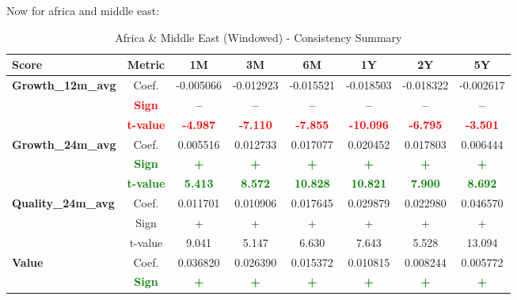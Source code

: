 \documentclass[11pt,english,a4paper,hidelinks]{book}
\begin{document}
\noindent Now for africa and middle east:
\begin{table}[H]
    \centering
    \caption{Africa \& Middle East (Windowed) - Consistency Summary}
    \begin{tabular}{lccccccc}
        \toprule
        \textbf{Score} & \textbf{Metric} & \textbf{1M} & \textbf{3M} & \textbf{6M} & \textbf{1Y} & \textbf{2Y} & \textbf{5Y} \\
        \midrule
        \multirow{3}{*}{\textbf{Growth\_12m\_avg}}
            & Coef.   & -0.005066 & -0.012923 & -0.015521 & -0.018503 & -0.018322 & -0.002617 \\
            & \textbf{\textcolor{red}{Sign}}    & \textbf{\textcolor{red}{–}} & \textbf{\textcolor{red}{–}} & \textbf{\textcolor{red}{–}} & \textbf{\textcolor{red}{–}} & \textbf{\textcolor{red}{–}} & \textbf{\textcolor{red}{–}} \\
            & \textbf{\textcolor{red}{t-value}} & \textbf{\textcolor{red}{-4.987}} & \textbf{\textcolor{red}{-7.110}} & \textbf{\textcolor{red}{-7.855}} & \textbf{\textcolor{red}{-10.096}} & \textbf{\textcolor{red}{-6.795}} & \textbf{\textcolor{red}{-3.501}} \\
        \multirow{3}{*}{\textbf{Growth\_24m\_avg}}
            & Coef.   & 0.005516 & 0.012733 & 0.017077 & 0.020452 & 0.017803 & 0.006444 \\
            & \textbf{\textcolor{green}{Sign}}    & \textbf{\textcolor{green}{+}} & \textbf{\textcolor{green}{+}} & \textbf{\textcolor{green}{+}} & \textbf{\textcolor{green}{+}} & \textbf{\textcolor{green}{+}} & \textbf{\textcolor{green}{+}} \\
            & \textbf{\textcolor{green}{t-value}} & \textbf{\textcolor{green}{5.413}} & \textbf{\textcolor{green}{8.572}} & \textbf{\textcolor{green}{10.828}} & \textbf{\textcolor{green}{10.821}} & \textbf{\textcolor{green}{7.900}} & \textbf{\textcolor{green}{8.692}} \\
        \midrule
        \multirow{3}{*}{\textbf{Quality\_24m\_avg}}
            & Coef.   & 0.011701 & 0.010906 & 0.017645 & 0.029879 & 0.022980 & 0.046570 \\
            & Sign    & + & + & + & + & + & + \\
            & t-value & 9.041 & 5.147 & 6.630 & 7.643 & 5.528 & 13.094 \\
        \midrule
        \multirow{3}{*}{\textbf{Value}}
            & Coef.   & 0.036820  & 0.026390  & 0.015372  & 0.010815  & 0.008244  & 0.005772  \\
            & \textbf{\textcolor{green}{Sign}}    & \textbf{\textcolor{green}{+}}         & \textbf{\textcolor{green}{+}}         & \textbf{\textcolor{green}{+}}         & \textbf{\textcolor{green}{+}}         & \textbf{\textcolor{green}{+}}         & \textbf{\textcolor{green}{+}}         \\

\end{tabular}
\end{table}
\end{document}
